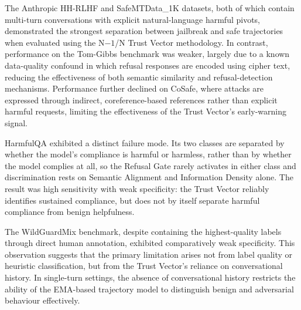 \documentclass[conference]{IEEEtran}
\begin{document}


The Anthropic HH-RLHF and SafeMTData\_1K datasets, both of which contain multi-turn conversations with explicit natural-language harmful pivots, demonstrated the strongest separation between jailbreak and safe trajectories when evaluated using the N$-1$/N Trust Vector methodology. In contrast, performance on the Tom-Gibbs benchmark was weaker, largely due to a known data-quality confound in which refusal responses are encoded using cipher text, reducing the effectiveness of both semantic similarity and refusal-detection mechanisms. Performance further declined on CoSafe, where attacks are expressed through indirect, coreference-based references rather than explicit harmful requests, limiting the effectiveness of the Trust Vector's early-warning signal.

HarmfulQA exhibited a distinct failure mode. Its two classes are separated by whether the model's compliance is harmful or harmless, rather than by whether the model complies at all, so the Refusal Gate rarely activates in either class and discrimination rests on Semantic Alignment and Information Density alone. The result was high sensitivity with weak specificity: the Trust Vector reliably identifies sustained compliance, but does not by itself separate harmful compliance from benign helpfulness.

The WildGuardMix benchmark, despite containing the highest-quality labels through direct human annotation, exhibited comparatively weak specificity. This observation suggests that the primary limitation arises not from label quality or heuristic classification, but from the Trust Vector's reliance on conversational history. In single-turn settings, the absence of conversational history restricts the ability of the EMA-based trajectory model to distinguish benign and adversarial behaviour effectively.
\end{document}
